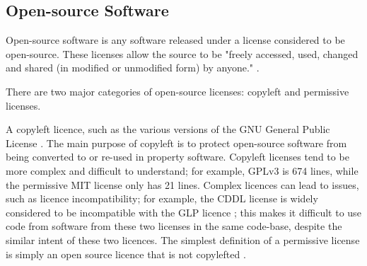 \documentclass{article}
\begin{document}
\subsection{Open-source Software}
\label{subsec:oss}
Open-source software is any software released under a license considered to be open-source. These licenses allow the source to be "freely accessed, used, changed and shared (in modified or unmodified form) by anyone." \cite{osi_faq}.

There are two major categories of open-source licenses: copyleft and permissive licenses. 

A copyleft licence, such as the various versions of the GNU General Public License \cite{gnu_copyleft}. The main purpose of copyleft is to protect open-source software from being converted to or re-used in property software. Copyleft licenses tend to be more complex and difficult to understand; for example, GPLv3 is 674 lines, while the permissive MIT license only has 21 lines. Complex licences can lead to issues, such as licence incompatibility; for example, the CDDL license is widely considered to be incompatible with the GLP licence \cite{gnu_cddl}; this makes it difficult to use code from software from these two licenses in the same code-base, despite the similar intent of these two licences. The simplest definition of a permissive license is simply an open source licence that is not copylefted \cite{osi_faq}.
\end{document}
